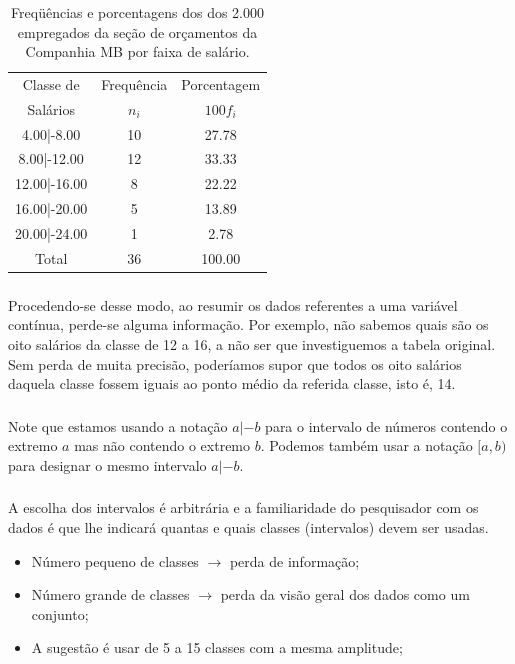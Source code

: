 \documentclass[14pt,aspectratio=1610]{beamer}
\begin{document}
\begin{frame}{}
\frametitle{}
\begin{block}{}
\justifying
\begin{table}[H]
\caption{Freqüências e porcentagens dos dos 2.000 empregados da seção de orçamentos da Companhia MB por faixa de salário.}
\label{tab4}
\begin{tabular}{c|c|c}
\hline
Classe de   &Frequência&Porcentagem\\
Salários    &$n_{i}$   &$100f_{i}$ \\
\hline
4.00|-8.00  &10        &27.78      \\
8.00|-12.00 &12        &33.33      \\
12.00|-16.00&8         &22.22      \\
16.00|-20.00&5         &13.89      \\
20.00|-24.00&1         & 2.78      \\
\hline
Total       &36        &100.00     \\
\hline
\end{tabular}
\end{table}
\end{block}
\end{frame}

\begin{frame}{}
\frametitle{}
\begin{block}{}
\justifying
Procedendo-se desse modo, ao resumir os dados referentes a uma variável contínua,
perde-se alguma informação. Por exemplo, não sabemos quais são os oito salários da
classe de 12 a 16, a não ser que investiguemos a tabela original. Sem perda de muita precisão, poderíamos supor que todos os oito salários daquela classe fossem iguais ao ponto médio da referida classe, isto é, 14.
\end{block}
\end{frame}

\begin{frame}{}
\frametitle{}
\begin{block}{}
\justifying
Note que estamos usando a notação $a|-b$ para o intervalo de números contendo o extremo $a$ mas não contendo o extremo $b.$ Podemos também usar a notação $[a, b)$ para designar o mesmo intervalo $a|-b$. 
\end{block}
\end{frame}

\begin{frame}{}
\frametitle{}
\begin{block}{}
\justifying
A escolha dos intervalos é arbitrária e a familiaridade do pesquisador com os dados é
que lhe indicará quantas e quais classes (intervalos) devem ser usadas.
\begin{itemize}
\item Número pequeno de classes $\rightarrow$ perda de informação;
\item Número grande de classes $\rightarrow$ perda da visão geral dos dados
como um conjunto;
\item A sugestão é usar de 5 a 15 classes com a mesma amplitude;
\end{itemize}
\end{block}
\end{frame}
\end{document}
